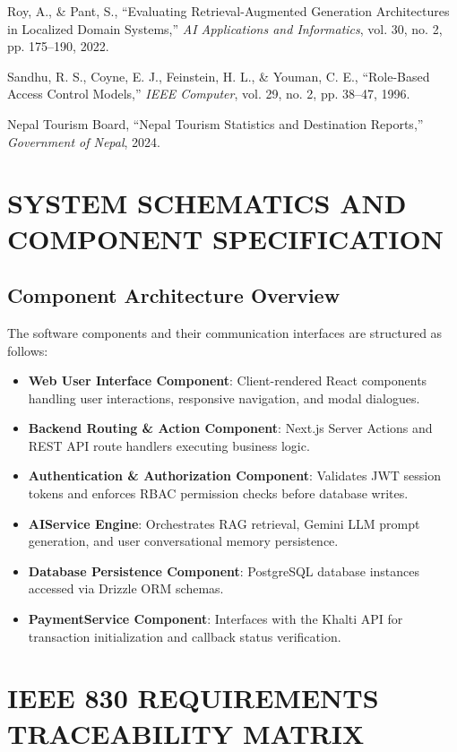 \documentclass[12pt,a4paper]{report}
\begin{document}
\begin{enumerate}[label={[\arabic*]}]
    \item Roy, A., \& Pant, S., ``Evaluating Retrieval-Augmented Generation Architectures in Localized Domain Systems,'' \emph{AI Applications and Informatics}, vol. 30, no. 2, pp. 175--190, 2022.
    \item Sandhu, R. S., Coyne, E. J., Feinstein, H. L., \& Youman, C. E., ``Role-Based Access Control Models,'' \emph{IEEE Computer}, vol. 29, no. 2, pp. 38--47, 1996.
    \item Nepal Tourism Board, ``Nepal Tourism Statistics and Destination Reports,'' \emph{Government of Nepal}, 2024.
\end{enumerate}

\appendix
\chapter{SYSTEM SCHEMATICS AND COMPONENT SPECIFICATION}

\section{Component Architecture Overview}
The software components and their communication interfaces are structured as follows:
\begin{itemize}
    \item \textbf{Web User Interface Component}: Client-rendered React components handling user interactions, responsive navigation, and modal dialogues.
    \item \textbf{Backend Routing \& Action Component}: Next.js Server Actions and REST API route handlers executing business logic.
    \item \textbf{Authentication \& Authorization Component}: Validates JWT session tokens and enforces RBAC permission checks before database writes.
    \item \textbf{AIService Engine}: Orchestrates RAG retrieval, Gemini LLM prompt generation, and user conversational memory persistence.
    \item \textbf{Database Persistence Component}: PostgreSQL database instances accessed via Drizzle ORM schemas.
    \item \textbf{PaymentService Component}: Interfaces with the Khalti API for transaction initialization and callback status verification.
\end{itemize}

\chapter{IEEE 830 REQUIREMENTS TRACEABILITY MATRIX}
\end{document}
